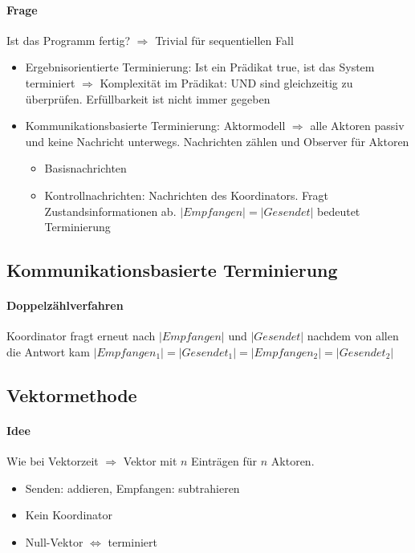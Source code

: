 \documentclass{scrartcl}
\begin{document}
\paragraph{Frage} Ist das Programm fertig? $\Rightarrow$ Trivial für sequentiellen Fall
\begin{itemize}
\item Ergebnisorientierte Terminierung: Ist ein Prädikat true, ist das System terminiert $\Rightarrow$ Komplexität im Prädikat: UND sind gleichzeitig zu überprüfen. Erfüllbarkeit ist nicht immer gegeben
\item Kommunikationsbasierte Terminierung: Aktormodell $\Rightarrow$ alle Aktoren passiv und keine Nachricht unterwegs. Nachrichten zählen und Observer für Aktoren
\begin{itemize}
\item Basisnachrichten
\item Kontrollnachrichten: Nachrichten des Koordinators. Fragt Zustandsinformationen ab. $|Empfangen| = |Gesendet|$ bedeutet Terminierung
\end{itemize}
\end{itemize}



\subsection{Kommunikationsbasierte Terminierung}
\paragraph{Doppelzählverfahren} Koordinator fragt erneut nach $|Empfangen|$ und $|Gesendet|$ nachdem von allen die Antwort kam $|Empfangen_1| = |Gesendet_1| = |Empfangen_2| = |Gesendet_2|$



\subsection{Vektormethode}
\paragraph{Idee} Wie bei Vektorzeit $\Rightarrow$ Vektor mit $n$ Einträgen für $n$ Aktoren.
\begin{itemize}
\item Senden: addieren, Empfangen: subtrahieren 
\item Kein Koordinator 
\item Null-Vektor $\Leftrightarrow$ terminiert
\end{itemize}
\end{document}
